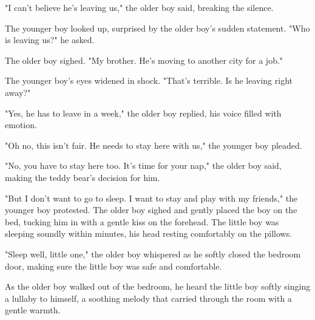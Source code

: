 \documentclass[smalldemyvopaper,11pt,twoside,onecolumn,openright,extrafontsizes]{memoir}
\begin{document}
"I can't believe he's leaving us," the older boy said, breaking the silence.\par
The younger boy looked up, surprised by the older boy's sudden statement. "Who is leaving us?" he asked.\par
The older boy sighed. "My brother. He's moving to another city for a job."\par
The younger boy's eyes widened in shock. "That's terrible. Is he leaving right away?"\par
"Yes, he has to leave in a week," the older boy replied, his voice filled with emotion.\par
"Oh no, this isn't fair. He needs to stay here with us," the younger boy pleaded.\par
"No, you have to stay here too. It's time for your nap," the older boy said, making the teddy bear's decision for him.\par
"But I don't want to go to sleep. I want to stay and play with my friends," the younger boy protested. The older boy sighed and gently placed the boy on the bed, tucking him in with a gentle kiss on the forehead. The little boy was sleeping soundly within minutes, his head resting comfortably on the pillows.\par
"Sleep well, little one," the older boy whispered as he softly closed the bedroom door, making sure the little boy was safe and comfortable.\par
As the older boy walked out of the bedroom, he heard the little boy softly singing a lullaby to himself, a soothing melody that carried through the room with a gentle warmth.\par
\end{document}
